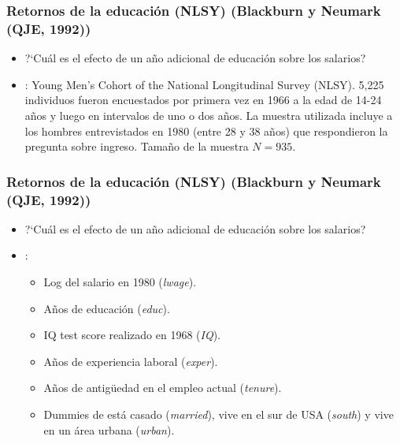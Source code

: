 \documentclass[t, compress, spanish, aspectratio=169]{beamer}
\newcommand{\term}[1]{\structure{\textbf{#1}}} %
\begin{document}
\begin{frame}
    \frametitle{Retornos de la educaci\'on (NLSY) (Blackburn y Neumark (QJE, 1992))}
    \begin{itemize}
        \item ?`Cu\'al es el efecto de un a\~no adicional de educaci\'on sobre los salarios?
        \item \term{Datos}: Young Men's Cohort of the National Longitudinal Survey (NLSY). 5,225 individuos fueron encuestados por primera vez en 1966 a la edad de 14-24 a\~nos y luego en intervalos de uno o dos a\~nos. La muestra utilizada incluye a los hombres entrevistados en 1980 (entre 28 y 38 a\~nos) que respondieron la pregunta sobre ingreso. Tama\~no de la muestra $N=935$.
    \end{itemize}
\end{frame}
\begin{frame}
    \frametitle{Retornos de la educaci\'on (NLSY) (Blackburn y Neumark (QJE, 1992))}
    \begin{itemize}
        \item ?`Cu\'al es el efecto de un a\~no adicional de educaci\'on sobre los salarios?
        \item \term{Variables}:
        \begin{itemize}
            \item Log del salario en 1980 (\emph{lwage}).
            \item A\~nos de educaci\'on (\emph{educ}).
            \item IQ test score realizado en  1968 (\emph{IQ}).
            \item A\~nos de experiencia laboral (\emph{exper}).
            \item A\~nos de antig\"uedad en el empleo actual (\emph{tenure}).
            \item Dummies de est\'a casado (\emph{married}), vive en el sur de USA (\emph{south}) y vive en un \'area urbana (\emph{urban}).
        \end{itemize}
    \end{itemize}
\end{frame}
\end{document}
